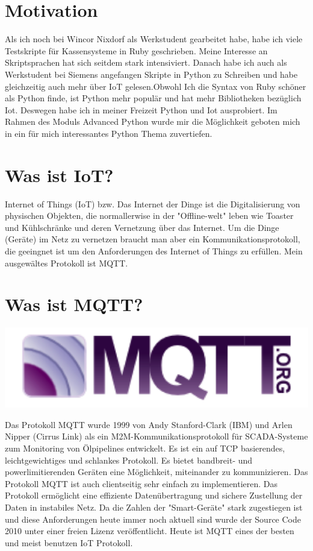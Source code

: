 \section{Motivation}
Als ich noch bei Wincor Nixdorf als Werkstudent gearbeitet habe, habe ich viele Testskripte für Kassensysteme in Ruby geschrieben. Meine Interesse an Skriptsprachen hat sich seitdem stark intensiviert. Danach habe ich auch als Werkstudent bei Siemens angefangen Skripte in Python zu Schreiben und habe gleichzeitig auch mehr über IoT gelesen.Obwohl Ich die Syntax von Ruby schöner als Python finde, ist Python mehr populär und hat mehr Bibliotheken bezüglich Iot. Deswegen habe ich in meiner Freizeit Python und Iot ausprobiert. Im Rahmen des Moduls Advanced Python wurde mir die Möglichkeit geboten mich in ein für mich interessantes Python Thema zuvertiefen.

\section{Was ist IoT?}
Internet of Things (IoT) bzw. Das Internet der Dinge ist die Digitalisierung von physischen Objekten, die normallerwise in der "Offline-welt" leben wie Toaster und Kühlschränke und deren Vernetzung über das Internet. Um die Dinge (Geräte) im Netz zu vernetzen braucht man aber ein 
Kommunikationsprotokoll, die geeingnet ist um den Anforderungen des Internet of Things zu erfüllen. Mein ausgewältes Protokoll ist MQTT.

\section{Was ist MQTT?}
\includegraphics[scale=0.4]{mqtt.png}

Das Protokoll MQTT wurde 1999 von Andy Stanford-Clark (IBM) und Arlen Nipper (Cirrus Link) als ein M2M-Kommunikationsprotokoll für SCADA-Systeme zum Monitoring von Ölpipelines entwickelt.
Es ist ein auf TCP basierendes, leichtgewichtiges und schlankes  Protokoll.
Es bietet bandbreit- und powerlimitierenden Geräten eine Möglichkeit, miteinander zu kommunizieren. Das Protokoll MQTT ist auch clientseitig sehr einfach zu implementieren.
Das Protokoll ermöglicht eine effiziente Datenübertragung und sichere Zustellung der Daten in instabiles Netz. Da die Zahlen der "Smart-Geräte" stark zugestiegen ist und diese Anforderungen heute immer noch aktuell sind wurde der Source Code 2010 unter einer freien Lizenz veröffentlicht. Heute ist MQTT eines der besten und meist benutzen IoT Protokoll.

